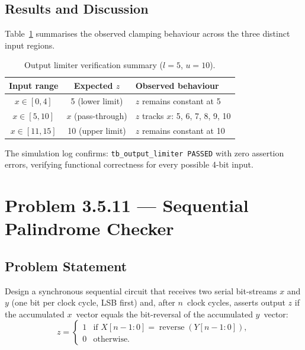 \documentclass[12pt]{article}
\begin{document}
\subsection{Results and Discussion}

Table~\ref{tab:limiter_results} summarises the observed clamping
behaviour across the three distinct input regions.

\begin{table}[H]
\centering
\caption{Output limiter verification summary ($l=5$, $u=10$).}
\label{tab:limiter_results}
\begin{tabular}{@{}ccl@{}}
\toprule
\textbf{Input range} & \textbf{Expected $z$} & \textbf{Observed behaviour} \\
\midrule
$x \in [0, 4]$    & 5 (lower limit)  & $z$ remains constant at 5 \\
$x \in [5, 10]$   & $x$ (pass-through) & $z$ tracks $x$: 5, 6, 7, 8, 9, 10 \\
$x \in [11, 15]$  & 10 (upper limit) & $z$ remains constant at 10 \\
\bottomrule
\end{tabular}
\end{table}

\noindent
The simulation log confirms: \texttt{tb\_output\_limiter PASSED} with
zero assertion errors, verifying functional correctness for every
possible 4-bit input.

\section{Problem 3.5.11 --- Sequential Palindrome Checker}
\label{sec:palindrome}

\subsection{Problem Statement}

Design a synchronous sequential circuit that receives two serial
bit-streams $x$ and $y$ (one bit per clock cycle, LSB first) and, after
$n$~clock cycles, asserts output $z$ if the accumulated $x$~vector
equals the bit-reversal of the accumulated $y$~vector:
\begin{equation}
  z = \begin{cases}
        1 & \text{if } X[n{-}1:0] = \operatorname{reverse}(Y[n{-}1:0]),\\
        0 & \text{otherwise.}
      \end{cases}
  \label{eq:palindrome}
\end{equation}
\end{document}
